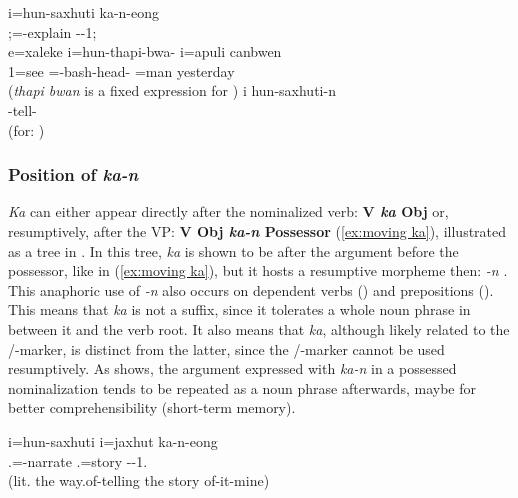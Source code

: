 \ea \label{ex:n}
\gll 	i={\ob}hun-{\ob}saxhuti{\cb} ka-n{\cb}-eong \\
	;=-explain --1;\\	
\glt  {}		
\z
\ea \label{ex:ka overt1}
\gll e=xaleke i=hun-thapi-bwa- i=apuli canbwen	\\
 1=see =-bash-head- =man yesterday	\\
\glt {} (\textit{thapi bwan} is a fixed expression for )
\z
\ea\label{ex:no_kan}
\gll *i hun-saxhuti-n\\
  -tell-\\
\glt (for: )
\z

\subsubsection{Position of \textit{ka-n}}

\textit{Ka} can either appear directly after the nominalized verb: \textbf{V \textit{ka} Obj} or, resumptively, after the VP: \textbf{V Obj \textit{ka-n} Possessor} (\ref{ex:moving ka}), illustrated as a tree in  . In this tree, \textit{ka} is shown to be  after the argument before the possessor, like in (\ref{ex:moving ka}), but it hosts a resumptive morpheme then: \textit{-n} . This anaphoric use of \textit{-n} also occurs on dependent verbs () and prepositions (). This means that \textit{ka} is not a suffix, since it tolerates a whole noun phrase in between it and the verb root. It also means that \textit{ka}, although likely related to the /-marker, is distinct from the latter, since the /-marker cannot be used resumptively. As  shows, the argument expressed with \textit{ka-n} in a possessed nominalization tends to be repeated as a noun phrase afterwards, maybe for better comprehensibility (short-term memory).

\ea
\label{ex:moving ka}\gll	i=hun-{\ob}saxhuti i=jaxhut{\cb} ka-n-eong\\
	.=-narrate .=story --1.\\
\glt	{} (lit. the way.of-telling the story of-it-mine)
\z


